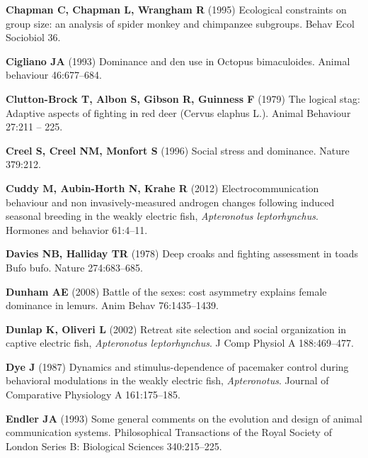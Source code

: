 \documentclass[vruler,JEB]{COB}%
\begin{document}
\begin{thebibliography}{70}
\textbf{Chapman C, Chapman L, Wrangham R} (1995) Ecological constraints on group size:
  an analysis of spider monkey and chimpanzee subgroups.
 Behav Ecol Sociobiol 36.

\textbf{Cigliano JA} (1993) Dominance and den use in Octopus bimaculoides.
 Animal behaviour 46:677--684.

\textbf{Clutton-Brock T, Albon S, Gibson R, Guinness F} (1979) The logical stag:
  Adaptive aspects of fighting in red deer (Cervus elaphus L.).
 Animal Behaviour 27:211 -- 225.

\textbf{Creel S, Creel NM, Monfort S} (1996) Social stress and dominance.
 Nature 379:212.

\textbf{Cuddy M, Aubin-Horth N, Krahe R} (2012) Electrocommunication behaviour and non
  invasively-measured androgen changes following induced seasonal breeding in
  the weakly electric fish, \textit{Apteronotus leptorhynchus}.
 Hormones and behavior 61:4--11.

\textbf{Davies NB, Halliday TR} (1978) Deep croaks and fighting assessment in toads Bufo
  bufo.
 Nature 274:683--685.

\textbf{Dunham AE} (2008) Battle of the sexes: cost asymmetry explains female dominance
  in lemurs.
 Anim Behav 76:1435--1439.

\textbf{Dunlap K, Oliveri L} (2002) Retreat site selection and social organization in
  captive electric fish, \textit{Apteronotus leptorhynchus}.
 J Comp Physiol A 188:469--477.

\textbf{Dye J} (1987) Dynamics and stimulus-dependence of pacemaker control during
  behavioral modulations in the weakly electric fish, \textit{Apteronotus}.
 Journal of Comparative Physiology A 161:175--185.

\textbf{Endler JA} (1993) Some general comments on the evolution and design of animal
  communication systems.
 Philosophical Transactions of the Royal Society of London Series B:
  Biological Sciences 340:215--225.


\end{thebibliography}
\end{document}
